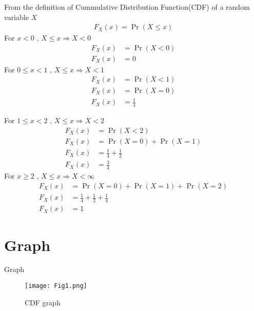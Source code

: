 \documentclass{beamer}
\providecommand{\pr}[1]{\ensuremath{\Pr\left(#1\right)}}
\begin{document}
\begin{frame}
From the definition of Cummulative Distribution Function(CDF) of a random variable $X$ 
\begin{align}
F_X(x) = \pr{X \le x}
\end{align}
For $x<0 $ , $X \le x \Rightarrow X<0$
\begin{align}
F_X(x) &= \pr{X<0} \\
F_X(x) &= 0
\end{align}
For $0 \le x < 1 $ , $X \le x \Rightarrow X<1$
\begin{align}
F_X(x) &= \pr{X < 1} \\
F_X(x) &= \pr{X=0} \\
F_X(x) &= \frac{1}{4}
\end{align}
\end{frame}
\begin{frame}
For $ 1 \le x < 2$ , $X \le x \Rightarrow X<2$
\begin{align}
F_X(x) &= \pr{X < 2} \\
F_X(x) &= \pr{X=0} + \pr{X=1}  \\
F_X(x) &= \frac{1}{4} + \frac{1}{2} \\
F_X(x) &= \frac{3}{4}  
\end{align}
For $ x \ge 2 $ , $X \le x \Rightarrow X<\infty$
\begin{align}
F_X(x) &= \pr{X=0} + \pr{X=1} + \pr{X=2} \\
F_X(x) &= \frac{1}{4} + \frac{1}{2} + \frac{1}{4} \\
F_X(x) &= 1
\end{align}
\end{frame}
\section{Graph}
\begin{frame}{Graph}
\begin{figure}[h]
\centering
\texttt{[image: Fig1.png]}
\caption{CDF graph}
\label{Fig 1}
\end{figure}
\end{frame}
\end{document}
